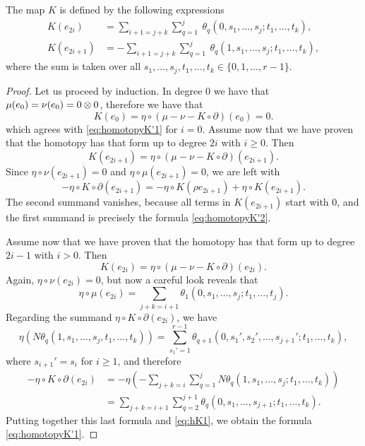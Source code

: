 \begin{lemma*}
	The map $K$ is defined by the following expressions
	\begin{align} \label{eq:homotopyK'1}
		K(e_{2i}) &= \sum_{i+1 = j+k} \sum_{q=1}^j \
		\theta_q(0,s_1,\dots,s_j;t_1,\dots,t_k), \\ \label{eq:homotopyK'2}
		K(e_{2i+1}) &= -\sum_{i+1 = j+k} \sum_{q=1}^j \
		\theta_q(1,s_1,\dots,s_j;t_1,\dots,t_k),
	\end{align}
	where the sum is taken over all $s_1,\dots,s_j,t_1,\dots,t_k\in \{0,1,\dots,r-1\}$.
\end{lemma*}

\begin{proof}
 	Let us proceed by induction.
	In degree $0$ we have that $\mu(e_0) = \nu(e_0) = 0\otimes 0$, therefore we have that
	\[K(e_0) = \eta \circ (\mu-\nu-K \circ \partial)(e_0) = 0.\]
	which agrees with \eqref{eq:homotopyK'1} for $i=0$.
	Assume now that we have proven that the homotopy has that form up to degree $2i$ with $i\geq 0$.
	Then
	\[K(e_{2i+1}) = \eta \circ (\mu-\nu-K \circ \partial)(e_{2i+1}).\]
	Since $\eta \circ \nu(e_{2i+1}) = 0$ and $\eta \circ \mu(e_{2i+1}) = 0$, we are left with
	\[-\eta \circ K \circ \partial(e_{2i+1}) = -\eta \circ K (\rho e_{2i+1}) + \eta \circ K (e_{2i+1}).
	\]
	The second summand vanishes, because all terms in $K(e_{2i+1})$ start with $0$, and the first summand is precisely the formula \eqref{eq:homotopyK'2}.

	Assume now that we have proven that the homotopy has that form up to degree $2i-1$ with $i>0$.
	Then
	\[K(e_{2i}) = \eta \circ (\mu-\nu-K \circ \partial)(e_{2i}).\]
	Again, $\eta \circ \nu(e_{2i}) = 0$, but now a careful look reveals that
	\begin{equation}\label{eq:hK1}\eta \circ \mu(e_{2i}) = \sum_{j+k=i+1}\theta_1(0,s_1,\dots,s_j;t_1,\dots,t_j).
	\end{equation}
	Regarding the summand $\eta \circ K \circ \partial(e_{2i})$, we have
	\[\eta(N\theta_q(1,s_1,\dots,s_j,t_1,\dots,t_k)) = \sum_{s_1' = 1}^{r-1}\theta_{q+1}(0,s_1',s_2',\dots,s_{j+1}';t_1,\dots,t_k),\]
	where $s_{i+1}' = s_i$ for $i\geq 1$, and therefore
	\begin{align*} \label{eq:hK2}
		-\eta \circ K \circ \partial(e_{2i})
		&= -\eta\left(-\sum_{j+k = i}\sum_{q=1}^j N\theta_q(1,s_1,\dots,s_j;t_1,\dots,t_k)\right) \\
		&= \sum_{j+k = i+1}\sum_{q=2}^{j+1}\theta_q(0,s_1,\dots,s_{j+1};t_1,\dots,t_k).
	\end{align*}
	Putting together this last formula and \eqref{eq:hK1}, we obtain the formula \eqref{eq:homotopyK'1}.
\end{proof}

